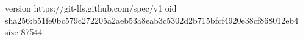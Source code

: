version https://git-lfs.github.com/spec/v1
oid sha256:b51fe0bc579c272205a2aeb53a8eab3c5302d2b715bfcf4920e38cf868012eb4
size 87544
